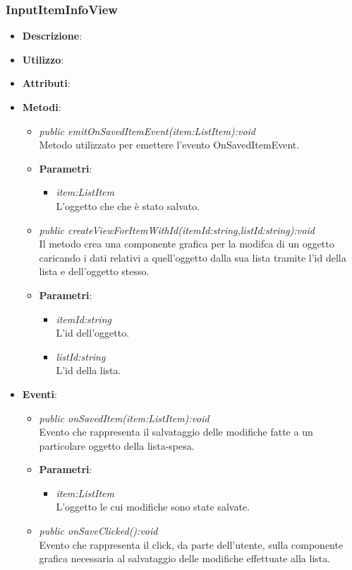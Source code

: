 \subsubsection{InputItemInfoView}
\begin{itemize}
\item \textbf{Descrizione}: 
\item \textbf{Utilizzo}:
\item \textbf{Attributi}:
\item \textbf{Metodi}:
	\begin{itemize}
	\item \textit{public emitOnSavedItemEvent(item:ListItem):void}\\
	Metodo utilizzato per emettere l'evento OnSavedItemEvent.
			\item{\textbf{Parametri}: \begin{itemize}
			\item \textit{item:ListItem}\\
			L'oggetto che che è stato salvato.
			\end{itemize}}
	\item \textit{public createViewForItemWithId(itemId:string,listId:string):void}\\
	Il metodo crea una componente grafica per la modifca di un oggetto caricando i dati relativi a quell'oggetto dalla sua lista tramite l'id della lista e dell'oggetto stesso.
			\item{\textbf{Parametri}: \begin{itemize}
			\item \textit{itemId:string}\\
			L'id dell'oggetto.
			\item \textit{listId:string}\\
			L'id della lista.
			\end{itemize}}
	\end{itemize}
\item \textbf{Eventi}:
	\begin{itemize}
	\item \textit{public onSavedItem(item:ListItem):void}\\
	Evento che rappresenta il salvataggio delle modifiche fatte a un particolare oggetto della lista-spesa.
			\item{\textbf{Parametri}: \begin{itemize}
			\item \textit{item:ListItem}\\
			L'oggetto le cui modifiche sono state salvate.
			\end{itemize}}
	\item \textit{public onSaveClicked():void}\\
	Evento che rappresenta il click, da parte dell'utente, sulla componente grafica necessaria al salvataggio delle modifiche effettuate alla lista.
	\end{itemize}
\end{itemize}